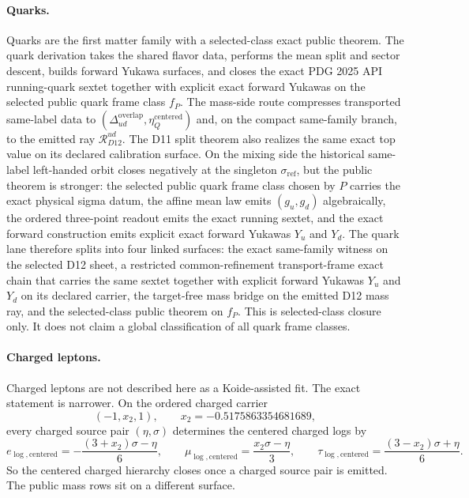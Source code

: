 \documentclass[11pt]{article}
\newcommand{\ophid}[1]{\path{#1}}
\begin{document}
\paragraph{Quarks.}\label{step5-quark-family-continuation}
Quarks are the first matter family with a selected-class exact public theorem. The quark derivation
takes the shared flavor data, performs the mean split and sector descent, builds forward Yukawa
surfaces, and closes the exact PDG 2025 API running-quark sextet together with explicit exact forward Yukawas on the selected public quark
frame class \(f_P\). The mass-side route compresses transported same-label data to
\((\Delta_{ud}^{\mathrm{overlap}},\eta_Q^{\mathrm{centered}})\) and, on the compact same-family
branch, to the emitted ray \(\mathcal R_{D12}^{ud}\). The D11 split theorem also realizes the same exact
top value on its declared calibration surface. On the mixing side the historical same-label left-handed orbit closes
negatively at the singleton \(\sigma_{\mathrm{ref}}\), but the public theorem is stronger: the
selected public quark frame class chosen by \(P\) carries the exact physical sigma datum, the
affine mean law emits \((g_u,g_d)\) algebraically, the ordered three-point readout emits the exact
running sextet, and the exact forward construction emits explicit exact forward Yukawas
\(Y_u\) and \(Y_d\). The quark lane therefore splits into four linked surfaces: the exact
same-family witness on the selected D12 sheet, a restricted common-refinement transport-frame exact
chain that carries the same sextet together with explicit forward Yukawas \(Y_u\) and \(Y_d\) on
its declared carrier, the target-free mass bridge \ophid{quark_d12_t1_value_law} on the emitted
D12 mass ray, and the selected-class public theorem on \(f_P\). This is selected-class closure
only. It does not claim a global classification of all quark frame classes.

\paragraph{Charged leptons.}\label{step5-charged-lepton-continuation}
Charged leptons are not described here as a Koide-assisted fit. The exact statement is narrower. On the ordered charged carrier
\[
(-1,x_2,1),
\qquad
x_2=-0.5175863354681689,
\]
every charged source pair \((\eta,\sigma)\) determines the centered charged logs by
\[
e_{\log,\mathrm{centered}}
=
-\frac{(3+x_2)\sigma-\eta}{6},
\qquad
\mu_{\log,\mathrm{centered}}
=
\frac{x_2\sigma-\eta}{3},
\qquad
\tau_{\log,\mathrm{centered}}
=
\frac{(3-x_2)\sigma+\eta}{6}.
\]
So the centered charged hierarchy closes once a charged source pair is emitted. The public mass rows sit on a different surface.
\end{document}
